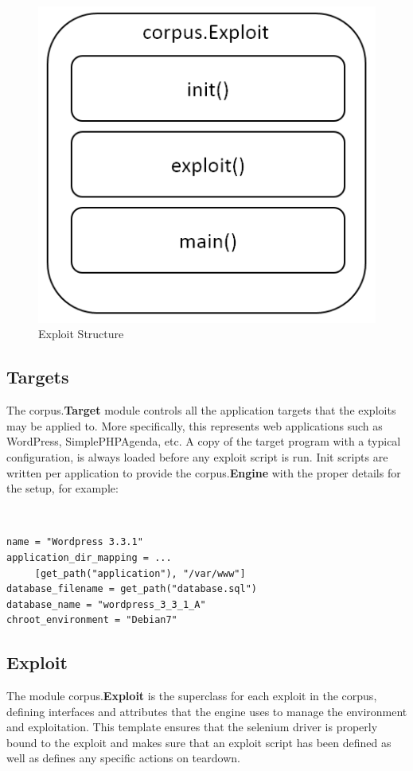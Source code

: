 \documentclass[letterpaper,twocolumn,10pt]{article}
\begin{document}
\begin{figure}[!tp]
\begin{center}
\includegraphics[scale=.5]{Corpus_Exploit.PNG}
\end{center}
\caption{Exploit Structure}
\end{figure}


\subsection{Targets}

   The corpus.{\bf Target} module controls all the application targets that the exploits may be applied to.  More specifically, this represents web applications such as WordPress, SimplePHPAgenda, etc. A copy of the target program with a typical configuration, is always loaded before any exploit script is run.  Init scripts are written per application to provide the corpus.{\bf Engine} with the proper details for the setup, for example:

{\tt \small
\begin{verbatim}
name = "Wordpress 3.3.1"
application_dir_mapping = ...
     [get_path("application"), "/var/www"]
database_filename = get_path("database.sql")
database_name = "wordpress_3_3_1_A"
chroot_environment = "Debian7"
\end{verbatim}
} 


\subsection{Exploit}
The module corpus.{\bf Exploit} is the superclass for each exploit in the corpus, defining interfaces and attributes that the engine uses to manage the environment and exploitation.  This template ensures that the selenium driver is properly bound to the exploit and makes sure that an exploit script has been defined as well as defines any specific actions on teardown.
\end{document}
